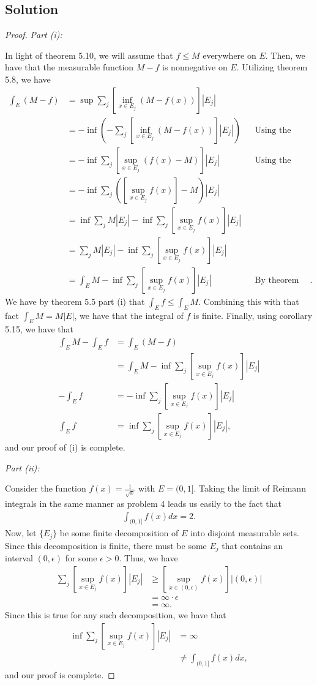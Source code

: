 \documentclass[10pt,a4paper]{article}
\makeatletter
\theoremstyle{theorem}
\newcommand{\proofpart}[2]{%
  \par
  \addvspace{\medskipamount}%
  \noindent\emph{Part #1: #2}\par\nobreak
  \addvspace{\smallskipamount}%
  \@afterheading
}
\theoremstyle{definition}
\makeatother
\begin{document}
\subsection*{Solution}
\begin{proof}
\proofpart{(i)}{} In light of theorem 5.10, we will assume that $f \leq M$ everywhere on $E$. Then, we have that the measurable function $M - f$ is nonnegative on $E$.  Utilizing theorem 5.8, we have
\begin{align*}
\int_E (M - f) &= \sup \sum_j [\inf_{x \in E_j} (M - f(x))]|E_j|\\
&= - \inf \left(- \sum_j [\inf_{x \in E_j} (M - f(x))]|E_j|\right) &&\text{Using the relation between inf and sup we used to prove 4.11}\\
&= - \inf \sum_j [\sup_{x \in E_j} (f(x) - M)]|E_j| &&\text{Using the same relation again}\\
&= - \inf \sum_j ([\sup_{x \in E_j} f(x)] - M)|E_j| \\
&= \inf \sum_j M|E_j| - \inf \sum_j [\sup_{x \in E_j} f(x)] |E_j| \\
&= \sum_j M|E_j| - \inf \sum_j [\sup_{x \in E_j} f(x)] |E_j| \\
&= \int_E M - \inf \sum_j [\sup_{x \in E_j} f(x)] |E_j|  &&\text{By theorem 5.7 and corollary 5.4}.
\end{align*}
We have by theorem 5.5 part (i) that $\int_E f \leq \int_E M$. Combining this with that fact $\int_E M = M|E|$, we have that the integral of $f$ is finite. Finally, using corollary 5.15, we have that 
\begin{align*}
\int_E M  - \int_E f &= \int_E (M - f)\\
&= \int_E M - \inf \sum_j [\sup_{x \in E_j} f(x)] |E_j|\\
- \int_E f &= - \inf \sum_j [\sup_{x \in E_j} f(x)] |E_j|\\
\int_E f &= \inf \sum_j [\sup_{x \in E_j} f(x)] |E_j|,
\end{align*}
and our proof of (i) is complete.

\proofpart{(ii)}{}
Consider the function $f(x) = \frac{1}{\sqrt{x}}$ with $E = (0, 1]$. Taking the limit of Reimann integrals in the same manner as problem 4 leads us easily to the fact that 
\begin{align*}
\int_{(0, 1]} f(x) dx = 2.
\end{align*}
Now, let $\{E_j \}$ be some finite decomposition of $E$ into disjoint measurable sets. Since this decomposition is finite, there must be some $E_j$ that contains an interval $(0, \epsilon)$ for some $\epsilon > 0$. Thus, we have
\begin{align*}
\sum_j [\sup_{x \in E_j} f(x)]|E_j| &\geq [\sup_{x \in (0, \epsilon)} f(x)]|(0, \epsilon)|\\
&= \infty \cdot \epsilon\\
&= \infty.
\end{align*}
Since this is true for any such decomposition, we have that
\begin{align*}
\inf \sum_j [\sup_{x \in E_j} f(x)] |E_j| &= \infty\\
&\not= \int_{(0, 1]} f(x) dx,
\end{align*}
and our proof is complete.
\end{proof}
\end{document}
